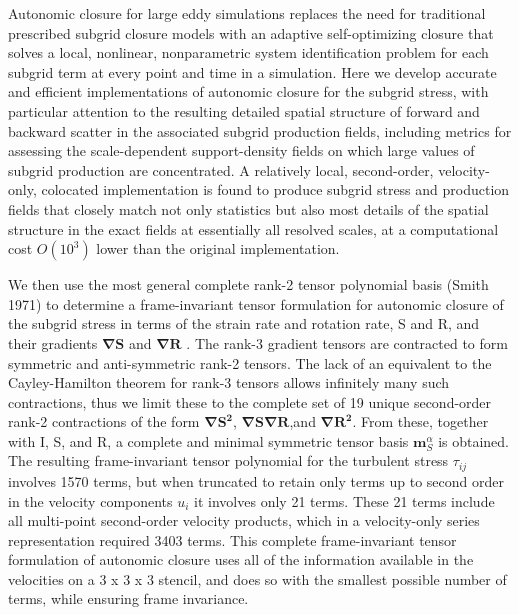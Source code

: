 Autonomic closure for large eddy simulations replaces the need for traditional prescribed subgrid closure models with an adaptive self-optimizing closure that solves a local, nonlinear, nonparametric system identification problem for each subgrid term at every point and time in a simulation. Here we develop accurate and efficient implementations of autonomic closure for the subgrid stress, with particular attention to the resulting detailed spatial structure of forward and backward scatter in the associated subgrid production fields, including metrics for assessing the scale-dependent support-density fields on which large values of subgrid production are concentrated. A relatively local, second-order, velocity-only, colocated implementation is found to produce subgrid stress and production fields that closely match not only statistics but also most details of the spatial structure in the exact fields at essentially all resolved scales, at a computational cost $O(10^3)$ lower than the original implementation. 

We then use the most general complete rank-2 tensor polynomial basis (Smith 1971) to determine a frame-invariant tensor formulation for autonomic closure of the subgrid stress in terms of the strain rate and rotation rate, S and R, and their gradients   $\mathbf{\nabla S}$  and   $\mathbf{\nabla R}$ . The rank-3 gradient tensors are contracted to form symmetric and anti-symmetric rank-2 tensors. The lack of an equivalent to the Cayley-Hamilton theorem for rank-3 tensors allows infinitely many such contractions, thus we limit these to the complete set of 19 unique second-order rank-2 contractions of the form   $\mathbf{\nabla S^2}$,   $\mathbf{\nabla S}$$\mathbf{\nabla R}$,and   $\mathbf{\nabla R^2}$. From these, together with I, S, and R, a complete and minimal symmetric tensor basis   $\mathbf{m}_{S}^{\alpha}$   is obtained. The resulting frame-invariant tensor polynomial for the turbulent stress   $\tau_{ij}$   involves 1570 terms, but when truncated to retain only terms up to second order in the velocity components  $u_i$  it involves only 21 terms. These 21 terms include all multi-point second-order velocity products, which in a velocity-only series representation required 3403 terms. This complete frame-invariant tensor formulation of autonomic closure uses all of the information available in the velocities on a  3 x 3 x 3 stencil, and does so with the smallest possible number of terms, while ensuring frame invariance.

